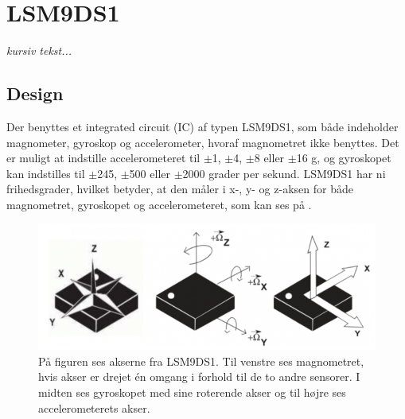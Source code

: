 \section{LSM9DS1}\label{sec_design_LSM9DS1}
\textit{kursiv tekst...}
\subsection{Design}
Der benyttes et integrated circuit (IC) af typen LSM9DS1, som både indeholder magnometer, gyroskop og accelerometer, hvoraf magnometret ikke benyttes. Det er muligt at indstille accelerometeret til $\pm$1, $\pm$4, $\pm$8 eller $\pm$16 g, og gyroskopet kan indstilles til $\pm$245, $\pm$500 eller $\pm$2000 grader per sekund. \citep{Jimb02016,STMicroelectronics2016} \newline
LSM9DS1 har ni frihedsgrader, hvilket betyder, at den måler i x-, y- og z-aksen for både magnometret, gyroskopet og accelerometeret, som kan ses på . %
\citep{STMicroelectronics2016}\newline 
\begin{figure}[H]
	\centering
	\includegraphics[scale=0.6]{figures/cDesign/LSM9DS1.png}
	\caption{På figuren ses akserne fra LSM9DS1. Til venstre ses magnometret, hvis akser er drejet én omgang i forhold til de to andre sensorer. I midten ses gyroskopet med sine roterende akser og til højre ses accelerometerets akser.\citep{Jimb02016}}
	\label{vores_IC}
\end{figure}
